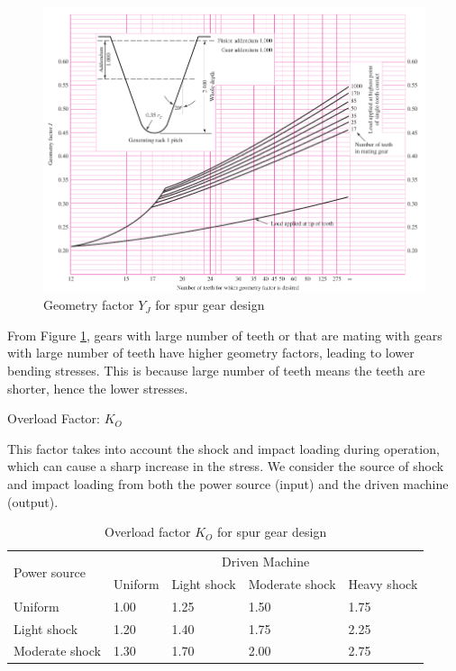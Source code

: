 \documentclass[a4paper,openany]{tufte-book}
\begin{document}
\begin{figure}[htbp]
\centering
\includegraphics[width=\textwidth]{./pictures/Gears/geometry-factor.png}
\caption{\label{fig: spur geometry factor}Geometry factor \(Y_J\) for spur gear design}
\end{figure}

From Figure \ref{fig: spur geometry factor}, gears with large number of teeth or that are mating with gears with large number of teeth have higher geometry factors, leading to lower bending stresses. This is because large number of teeth means the teeth are shorter, hence the lower stresses.

Overload Factor: \(K_{O}\)

This factor takes into account the shock and impact loading during operation, which can cause a sharp increase in the stress. We consider the source of shock and impact loading from both the power source (input) and the driven machine (output).

\begin{table}[htbp]
\caption{Overload factor \(K_O\) for spur gear design}
\centering
\begin{tabular}{lp{1.5cm}p{1.5cm}p{1.5cm}p{1.5cm}}
\toprule
\multirow{2}{*}{Power source} & \multicolumn{4}{c}{Driven Machine} &  &  & \\
 & Uniform & Light shock & Moderate shock & Heavy shock\\
\midrule
Uniform & 1.00 & 1.25 & 1.50 & 1.75\\
Light shock & 1.20 & 1.40 & 1.75 & 2.25\\
Moderate shock & 1.30 & 1.70 & 2.00 & 2.75\\
\bottomrule
\end{tabular}
\end{table}
\end{document}
